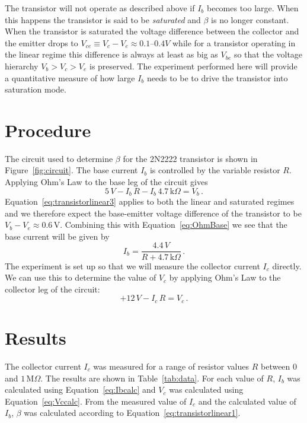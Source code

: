 \documentclass[aps,prl,twocolumn,groupedaddress]{revtex4}
\begin{document}
The transistor will not operate as described above if $I_b$ becomes too large.  When this happens the transistor is said to be \emph{saturated} and  $\beta$ is no longer constant.  When the transistor is saturated the voltage difference between the collector and the emitter drops to $V_{ce} \equiv V_c - V_e \approx 0.1$--$0.4 V$  while for a transistor operating in the linear regime this difference is always at least as big as $V_{be}$ so that the voltage hierarchy $V_b > V_c > V_e$ is preserved. The experiment performed here will provide a quantitative measure of how large $I_b$ needs to be to drive the transistor into saturation mode.



\section{Procedure}

The circuit used to determine $\beta$ for the 2N2222 transistor is shown in Figure~\ref{fig:circuit}.  The base current $I_b$ is controlled by the variable resistor $R$.  Applying Ohm's Law to the base leg of the circuit gives 
\begin{equation}
	5 \, V - I_b \, R - I_b \, 4.7 \, \mathrm{k}\Omega = V_b \, . 
	\label{eq:OhmBase}
\end{equation}
Equation~\ref{eq:transistorlinear3} applies to both the linear and saturated regimes and we therefore expect the base-emitter voltage difference of the transistor to be $V_b - V_e \approx 0.6 \, \mathrm{V}$.  Combining this with Equation~\ref{eq:OhmBase} we see that the base current will be given by
\begin{equation}
	I_b = \frac{4.4 \, V}{R + 4.7 \, \mathrm{k}\Omega} \, .
	\label{eq:Ibcalc}
\end{equation}
The experiment is set up so that we will measure the collector current $I_c$ directly.  We can use this to determine the value of $V_c$ by applying Ohm's Law to the collector leg of the circuit:
\begin{equation}
	+12 \, V - I_c \, R = V_c \, . 
	\label{eq:Vccalc}
\end{equation}



\section{Results}

The collector current $I_c$ was measured for a range of resistor values $R$ between $0$ and $1 \, \mathrm{M}\Omega$.  The results are shown in Table~\ref{tab:data}.  For each value of $R$, $I_b$ was calculated using Equation~\ref{eq:Ibcalc} and $V_c$ was calculated using Equation~\ref{eq:Vccalc}.  From the measured value of $I_c$ and the calculated value of $I_b$, $\beta$ was calculated according to Equation~\ref{eq:transistorlinear1}.
\end{document}
